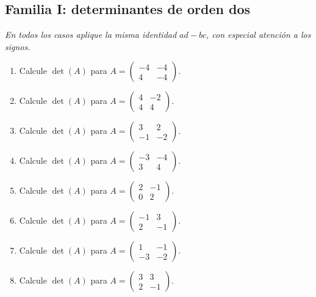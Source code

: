 \documentclass[12pt]{article}
\theoremstyle{remark}
\newcounter{contadorEjercicio}
\newenvironment{listaejercicios}{\begin{enumerate}[label=\textbf{E\arabic*.},leftmargin=2.4em,itemsep=0.52em]\setcounter{enumi}{\value{contadorEjercicio}}}{\setcounter{contadorEjercicio}{\value{enumi}}\end{enumerate}}
\begin{document}
\subsection{Familia I: determinantes de orden dos}\noindent\textit{En todos los casos aplique la misma identidad $ad-bc$, con especial atención a los signos.}\par\medskip
\begin{listaejercicios}

\item Calcule $\det(A)$ para $A=\begin{pmatrix}-4&-4\\4&-4\end{pmatrix}$.

\item Calcule $\det(A)$ para $A=\begin{pmatrix}4&-2\\4&4\end{pmatrix}$.

\item Calcule $\det(A)$ para $A=\begin{pmatrix}3&2\\-1&-2\end{pmatrix}$.

\item Calcule $\det(A)$ para $A=\begin{pmatrix}-3&-4\\3&4\end{pmatrix}$.

\item Calcule $\det(A)$ para $A=\begin{pmatrix}2&-1\\0&2\end{pmatrix}$.

\item Calcule $\det(A)$ para $A=\begin{pmatrix}-1&3\\2&-1\end{pmatrix}$.

\item Calcule $\det(A)$ para $A=\begin{pmatrix}1&-1\\-3&-2\end{pmatrix}$.

\item Calcule $\det(A)$ para $A=\begin{pmatrix}3&3\\2&-1\end{pmatrix}$.


\end{listaejercicios}
\end{document}
